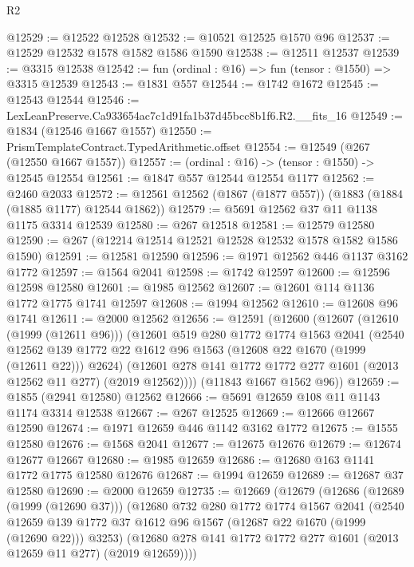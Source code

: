 \begin{lexlean}{R2}
\begin{coremodule}
@12529 := @12522 @12528
@12532 := @10521 @12525 @1570 @96
@12537 := @12529 @12532 @1578 @1582 @1586 @1590
@12538 := @12511 @12537
@12539 := @3315 @12538
@12542 := fun (ordinal : @16) => fun (tensor : @1550) => @3315 @12539
@12543 := @1831 @557
@12544 := @1742 @1672
@12545 := @12543 @12544
@12546 := LexLeanPreserve.Ca933654ac7c1d91fa1b37d45bcc8b1f6.R2.__fits_16
@12549 := @1834 (@12546 @1667 @1557)
@12550 := PrismTemplateContract.TypedArithmetic.offset
@12554 := @12549 (@267 (@12550 @1667 @1557))
@12557 := (ordinal : @16) -> (tensor : @1550) -> @12545 @12554
@12561 := @1847 @557 @12544 @12554 @1177
@12562 := @2460 @2033
@12572 := @12561 @12562 (@1867 (@1877 @557)) (@1883 (@1884 (@1885 @1177) @12544 @1862))
@12579 := @5691 @12562 @37 @11 @1138 @1175 @3314 @12539
@12580 := @267 @12518
@12581 := @12579 @12580
@12590 := @267 (@12214 @12514 @12521 @12528 @12532 @1578 @1582 @1586 @1590)
@12591 := @12581 @12590
@12596 := @1971 @12562 @446 @1137 @3162 @1772
@12597 := @1564 @2041
@12598 := @1742 @12597
@12600 := @12596 @12598 @12580
@12601 := @1985 @12562
@12607 := @12601 @114 @1136 @1772 @1775 @1741 @12597
@12608 := @1994 @12562
@12610 := @12608 @96 @1741
@12611 := @2000 @12562
@12656 := @12591
    (@12600
      (@12607
        (@12610 (@1999 (@12611 @96)))
        (@12601
          @519
          @280
          @1772
          @1774
          @1563
          @2041
          (@2540
            @12562
            @139
            @1772
            @22
            @1612
            @96
            @1563
            (@12608 @22 @1670 (@1999 (@12611 @22)))
            @2624)
          (@12601 @278 @141 @1772 @1772 @277 @1601 (@2013 @12562 @11 @277) (@2019 @12562))))
      (@11843 @1667 @1562 @96))
@12659 := @1855 (@2941 @12580) @12562
@12666 := @5691 @12659 @108 @11 @1143 @1174 @3314 @12538
@12667 := @267 @12525
@12669 := @12666 @12667 @12590
@12674 := @1971 @12659 @446 @1142 @3162 @1772
@12675 := @1555 @12580
@12676 := @1568 @2041
@12677 := @12675 @12676
@12679 := @12674 @12677 @12667
@12680 := @1985 @12659
@12686 := @12680 @163 @1141 @1772 @1775 @12580 @12676
@12687 := @1994 @12659
@12689 := @12687 @37 @12580
@12690 := @2000 @12659
@12735 := @12669
    (@12679
      (@12686
        (@12689 (@1999 (@12690 @37)))
        (@12680
          @732
          @280
          @1772
          @1774
          @1567
          @2041
          (@2540
            @12659
            @139
            @1772
            @37
            @1612
            @96
            @1567
            (@12687 @22 @1670 (@1999 (@12690 @22)))
            @3253)
          (@12680 @278 @141 @1772 @1772 @277 @1601 (@2013 @12659 @11 @277) (@2019 @12659))))

\end{coremodule}
\end{lexlean}
